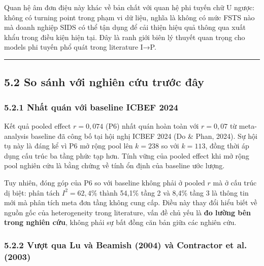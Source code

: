 \documentclass[12pt,a4paper]{article}
\begin{document}
Quan hệ âm đơn điệu này khác về bản chất với quan hệ phi tuyến chữ U
ngược: không có turning point trong phạm vi dữ liệu, nghĩa là không có
mức FSTS nào mà doanh nghiệp SIDS có thể tận dụng để cải thiện hiệu quả
thông qua xuất khẩu trong điều kiện hiện tại. Đây là ranh giới biên lý
thuyết quan trọng cho models phi tuyến phổ quát trong literature I→P.

\begin{center}\rule{0.5\linewidth}{0.5pt}\end{center}

\hypertarget{52-so-suxe1nh-vux1edbi-nghiuxean-cux1ee9u-trux1b0ux1edbc-ux111uxe2y}{%
\subsection{5.2 So sánh với nghiên cứu trước
đây}\label{52-so-suxe1nh-vux1edbi-nghiuxean-cux1ee9u-trux1b0ux1edbc-ux111uxe2y}}

\hypertarget{521-nhux1ea5t-quuxe1n-vux1edbi-baseline-icbef-2024}{%
\subsubsection{5.2.1 Nhất quán với baseline ICBEF
2024}\label{521-nhux1ea5t-quuxe1n-vux1edbi-baseline-icbef-2024}}

Kết quả pooled effect \(r = 0{,}074\) (P6) nhất quán hoàn toàn với
\(r = 0{,}07\) từ meta-analysis baseline đã công bố tại hội nghị ICBEF
2024 (Do \& Phan, 2024). Sự hội tụ này là đáng kể vì P6 mở rộng pool lên
\(k = 238\) so với \(k = 113\), đồng thời áp dụng cấu trúc ba tầng phức
tạp hơn. Tính vững của pooled effect khi mở rộng pool nghiên cứu là bằng
chứng về tính ổn định của baseline ước lượng.

Tuy nhiên, đóng góp của P6 so với baseline không phải ở pooled \(r\) mà
ở cấu trúc dị biệt: phân tách \(I^2 = 62{,}4\%\) thành 54,1\% tầng 2 và
8,4\% tầng 3 là thông tin mới mà phân tích meta đơn tầng không cung cấp.
Điều này thay đổi hiểu biết về nguồn gốc của heterogeneity trong
literature, vấn đề chủ yếu là \textbf{đo lường bên trong nghiên cứu},
không phải sự bất đồng căn bản giữa các nghiên cứu.

\hypertarget{522-vux1b0ux1ee3t-qua-lu-vuxe0-beamish-2004-vuxe0-contractor-et-al-2003}{%
\subsubsection{5.2.2 Vượt qua Lu và Beamish (2004) và Contractor et al.
(2003)}\label{522-vux1b0ux1ee3t-qua-lu-vuxe0-beamish-2004-vuxe0-contractor-et-al-2003}}
\end{document}

